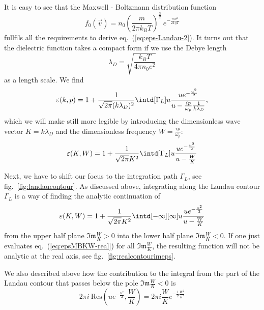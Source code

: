 \documentclass[physics,phd,nolot,nolof]{uccthesis}%
\begin{document}
It is easy to see that the Maxwell - Boltzmann distribution function 
\begin{equation}
	f_0(\vec v)=n_0 \left( \frac{m}{2\pi k_B T}\right)^{\frac{3}{2}}~e^{-\frac{mv^2}{2k_BT}}
	\label{eq:fMB}
\end{equation}
fullfils all the requirements to derive eq.~(\ref{eq:eps-Landau-2}). 
It turns out that the dielectric function takes a compact form if we use the  Debye length 
\begin{equation}
	\lambda_D=\sqrt{\frac{k_BT}{4\pi n_0 e^2}}
	\label{eq:Debye-length}
\end{equation}
as a length scale.
We find
\begin{equation}
	\varepsilon(k,p)=1+\frac{1}{\sqrt{2\pi}(k\lambda_D)^2}\intd[\Gamma_L]u\frac{u e^{-\frac{u^2}{2}}}{u-\frac{ip}{\omega_p}\frac{1}{k \lambda_D}},
	\label{eq:epsMB}
\end{equation}
which we will make still more legible by introducing the dimensionless wave vector
$K=k\lambda_D$ and the dimensionless frequency
$W=\frac{ip}{\omega_p}$:
\begin{equation}
	\varepsilon(K,W)=1+\frac{1}{\sqrt{2\pi}K^2}\intd[\Gamma_L]u \frac{u e^{-\frac{u^2}{2}}}{u-\frac{W}{K}}
	\label{eq:epsMBKW}
\end{equation}

Next, we have to shift our focus to the integration path $\Gamma_L$, see fig.~\ref{fig:landaucontour}.
As discussed above, integrating along the Landau contour $\Gamma_L$ is a way of finding the analytic continuation of 
\begin{equation}
	\varepsilon(K,W)=1+\frac{1}{\sqrt{2\pi}K^2}\intd[-\infty][\infty]u \frac{u e^{-\frac{u^2}{2}}}{u-\frac{W}{K}}
	\label{eq:epsMBKW-real}
\end{equation}
from the upper half plane $\mathfrak{Im}\frac{W}{K} >0$ into the lower half plane $\mathfrak{Im}\frac{W}{K}<0$.
If one just evaluates eq.~(\ref{eq:epsMBKW-real}) for all $\mathfrak{Im}\frac{W}{K}$, the resulting function will not be analytic at the real axis, see fig.~\ref{fig:realcontourimeps}.

We also described above how the contribution to the integral from the part of the Landau contour that passes below the pole $\mathfrak{Im}\frac{W}{K}<0$ is 
\begin{equation}
	2\pi i~\text{Res}\left(u e^{-\frac{u^2}{2}},\frac{W}{K}\right)
	=2\pi i\frac{W}{K} e^{-\frac{1}{2}\frac{W^2}{K^2}}
	\label{eq:ResMB}
\end{equation}
\end{document}
